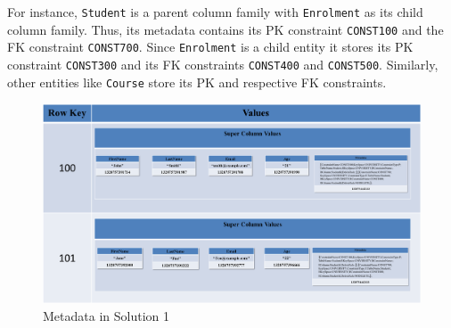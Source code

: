 For instance,  \texttt{Student}  is a parent column family with
\texttt{Enrolment} as its child column family. 
Thus,  its metadata  contains its \ac{PK} constraint \texttt{CONST100} and
the \ac{FK} constraint \texttt{CONST700}.  Since \texttt{Enrolment} is a child entity
it  stores its \ac{PK} constraint \texttt{CONST300} and its \ac{FK} constraints
\texttt{CONST400} and \texttt{CONST500}.  Similarly,  other entities like
\texttt{Course} store its \ac{PK} and respective \ac{FK} constraints. 
	
	\begin{landscape}
	\begin{figure}
	\centering
	\includegraphics[width=1.5\textwidth]{./figure/Solutions/Sol1-MD-ColumnFamily.png}
	\caption{Metadata in Solution 1}
	\end{figure}
	\end{landscape}
	
